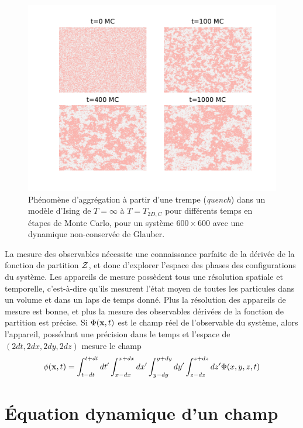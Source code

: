 \begin{figure}[t]
    \centering
    \includegraphics[width=0.9\linewidth]{intro/clusterization.pdf}
    \caption{Phénomène d'aggrégation à partir d'une trempe (\textit{quench}) dans un modèle d'Ising de $T=\infty$ à $T=T_{2D,C}$ \cite{onsager_crystal_1944} pour différents temps en étapes de Monte Carlo, pour un système $600 \times 600$ avec une dynamique non-conservée de Glauber.}
    \label{clusterization}
\end{figure}

La mesure des observables nécessite une connaissance parfaite de la dérivée de la fonction de partition $\mathcal{Z}$, et donc d'explorer l'espace des phases des configurations du système. Les appareils de mesure possèdent tous une résolution spatiale et temporelle, c'est-à-dire qu'ils mesurent l'état moyen de toutes les particules dans un volume et dans un laps de temps donné. Plus la résolution des appareils de mesure est bonne, et plus la mesure des observables dérivées de la fonction de partition est précise. Si $\Phi({\bf x},t)$ est le champ réel de l'observable du système, alors l'appareil, possédant une précision dans le temps et l'espace de $(2dt,2dx,2dy,2dz)$ mesure le champ
\begin{align}
    \phi({\bf x},t) = \int_{t-dt}^{t+dt} dt' \int_{x-dx}^{x+dx} dx' \int_{y-dy}^{y+dy} dy' \int_{z-dz}^{z+dz} dz' \Phi(x,y,z,t)
\end{align}


\section{Équation dynamique d'un champ}


